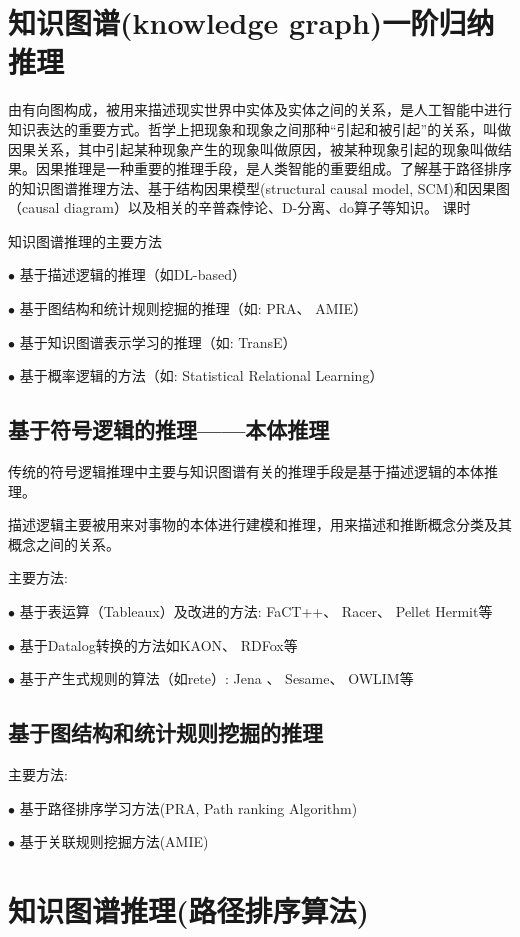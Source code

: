 \section{知识图谱(knowledge graph)一阶归纳推理}
由有向图构成，被用来描述现实世界中实体及实体之间的关系，是人工智能中进行知识表达的重要方式。哲学上把现象和现象之间那种“引起和被引起”的关系，叫做因果关系，其中引起某种现象产生的现象叫做原因，被某种现象引起的现象叫做结果。因果推理是一种重要的推理手段，是人类智能的重要组成。了解基于路径排序的知识图谱推理方法、基于结构因果模型(structural causal model, SCM)和因果图（causal diagram）以及相关的辛普森悖论、D-分离、do算子等知识。
课时

知识图谱推理的主要方法

$\bullet$ 基于描述逻辑的推理（如DL-based）

$\bullet$ 基于图结构和统计规则挖掘的推理（如: PRA、 AMIE）

$\bullet$ 基于知识图谱表⽰学习的推理（如: TransE）

$\bullet$ 基于概率逻辑的⽅法（如: Statistical Relational Learning）
\subsection{基于符号逻辑的推理——本体推理}

传统的符号逻辑推理中主要与知识图谱有关的推理手段是基于描述逻辑的本体推理。

描述逻辑主要被⽤来对事物的本体进⾏建模和推理，⽤来描述和推断概念分类及其概念之间的关系。

主要方法:

$\bullet$ 基于表运算（Tableaux）及改进的⽅法: FaCT++、 Racer、 Pellet Hermit等

$\bullet$ 基于Datalog转换的⽅法如KAON、 RDFox等

$\bullet$ 基于产⽣式规则的算法（如rete）:  Jena 、 Sesame、 OWLIM等

\subsection{基于图结构和统计规则挖掘的推理}

主要方法:

$\bullet$ 基于路径排序学习⽅法(PRA, Path ranking Algorithm)

$\bullet$ 基于关联规则挖掘⽅法(AMIE)
\section{知识图谱推理(路径排序算法)}

